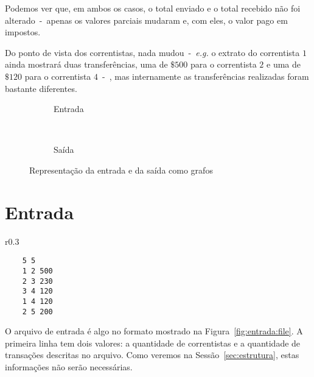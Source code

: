 \documentclass[12pt]{article}
\begin{document}
Podemos ver que, em ambos os casos, o total enviado e o total recebido não foi
alterado~-~apenas os valores parciais mudaram e, com eles, o valor pago em impostos.

Do ponto de vista dos correntistas, nada mudou~-~\textit{e.g.} o extrato do
correntista $1$ ainda mostrará duas transferências, uma de $\$500$ para o
correntista $2$ e uma de $\$120$ para o correntista $4$~-~, mas internamente as
transferências realizadas foram bastante diferentes.

\begin{figure}[htb!]
  \centering
  \begin{subfigure}[b]{0.5\textwidth}
    \begin{dot2tex}[neato,options=-tmath]
        
    \end{dot2tex}
    \caption{Entrada}
    \label{fig:intro:entrada}
  \end{subfigure}%
  ~
  \begin{subfigure}[b]{0.5\textwidth}
    \begin{dot2tex}[neato,options=-tmath]
        
    \end{dot2tex}
    \caption{Saída}
    \label{fig:intro:saída}
  \end{subfigure}
  \caption{Representação da entrada e da saída como grafos}
  \label{fig:intro}
\end{figure}

\section{Entrada}\label{sec:entrada}

\begin{wrapfigure}{r}{0.3\textwidth}
  \vspace{-20pt}
  \begin{center}
    \begin{lstlisting}
    5 5
    1 2 500
    2 3 230
    3 4 120
    1 4 120
    2 5 200
    \end{lstlisting}
  \end{center}
  \caption{Arquivo de entrada}
  \vspace{-10pt}
\label{fig:entrada:file}
\end{wrapfigure}

O arquivo de entrada é algo no formato mostrado na Figura~\ref{fig:entrada:file}.
A primeira linha tem dois valores: a quantidade de correntistas e a quantidade
de transações descritas no arquivo. Como veremos na Sessão~\ref{sec:estrutura},
estas informações não serão necessárias.
\end{document}
